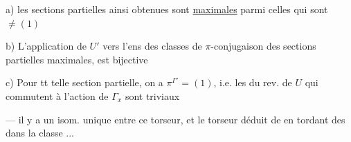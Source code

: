  a)  les sections partielles ainsi obtenues sont \uline{maximales} parmi celles qui sont $\ne(1)$

 b) L'application de $U'$ vers l'ens des classes de $\pi$-conjugaison des sections partielles   maximales, est bijective


 c) Pour tt telle section partielle, on a $\pi^{\Gamma'}=(1)$, i.e. les   du rev.   de $U$ qui commutent à l'action de $\Gamma_x$ sont triviaux

--- il y a un isom. unique  entre ce torseur, et le torseur déduit de  en tordant    des  dans la classe  \unsure{$[\Gamma_x]$}...

